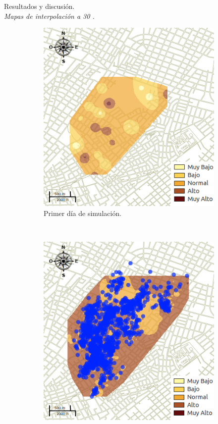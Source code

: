 \begin{frame}[t]{Resultados y discusión.\\\textit{Mapas de interpolación a 30 \textcelsius.}}
    \begin{figure}
    \begin{subfigure}[b]{0.45\textwidth}
        \includegraphics[width=\textwidth]{./graphics/inicial.png}
        \caption{ Primer día de simulación.}
    \end{subfigure}
    ~~~~
    \begin{subfigure}[b]{0.45\textwidth}
        \includegraphics[width=\textwidth]{./graphics/temp-30-final.png}

\end{subfigure}
\end{figure}
\end{frame}
